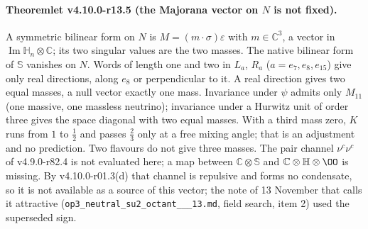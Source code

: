 \paragraph{Theoremlet v4.10.0-r13.5 (the Majorana vector on \(N\) is not fixed).}
A symmetric bilinear form on \(N\) is \(M=(m\cdot\sigma)\varepsilon\) with \(m\in\mathbb C^3\), a vector in
\(\operatorname{Im}\mathbb H_n\otimes\mathbb C\); its two singular values are the two masses.  The native bilinear form of \(\mathbb S\)
vanishes on \(N\).  Words of length one and two in \(L_a\), \(R_a\) (\(a=e_7,e_8,e_{15}\)) give only real directions, along
\(e_8\) or perpendicular to it.  A real direction gives two equal masses, a null vector exactly one mass.  Invariance under
\(\psi\) admits only \(M_{11}\) (one massive, one massless neutrino); invariance under a Hurwitz unit of order three gives the
space diagonal with two equal masses.  With a third mass zero, \(K\) runs from \(1\) to \(\tfrac12\) and passes \(\tfrac23\) only
at a free mixing angle; that is an adjustment and no prediction.  Two flavours do not give three masses.  The pair channel
\(\nu^c\nu^c\) of v4.9.0-r82.4 is not evaluated here; a map between \(\mathbb C\otimes\mathbb S\) and
\(\mathbb C\otimes\mathbb H\otimes\OO\) is missing.  By v4.10.0-r01.3(d) that channel is repulsive and forms no condensate, so it
is not available as a source of this vector; the note of 13 November that calls it attractive
(\texttt{op3\_\allowbreak neutral\_\allowbreak su2\_\allowbreak octant\_\_\_\allowbreak 13.md}, field search, item 2) used the superseded sign.

